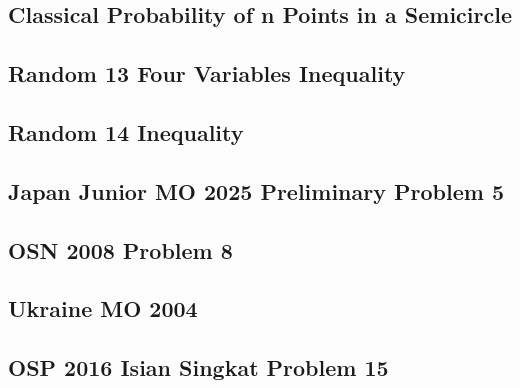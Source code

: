 \subsection{Classical Probability of n Points in a Semicircle}

\newpage

\subsection{Random 13 Four Variables Inequality}

\newpage

\subsection{Random 14 Inequality}

\newpage

\subsection{Japan Junior MO 2025 Preliminary Problem 5}

\newpage

\subsection{OSN 2008 Problem 8}

\newpage

\subsection{Ukraine MO 2004}

\newpage

\subsection{OSP 2016 Isian Singkat Problem 15}

\newpage


